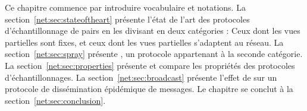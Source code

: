 Ce chapitre commence par introduire vocabulaire et notations. La
section~\ref{net:sec:stateoftheart} présente l'état de l'art des protocoles
d'échantillonnage de pairs en les divisant en deux catégories : Ceux dont les
vues partielles sont fixes, et ceux dont les vues partielles s'adaptent au
réseau. La section~\ref{net:sec:spray} présente \SPRAY, un protocole appartenant
à la seconde catégorie. La section~\ref{net:sec:properties} présente et compare
les propriétés des protocoles d'échantillonnages. La
section~\ref{net:sec:broadcast} présente l'effet de \SPRAY sur un protocole de
dissémination épidémique de messages. Le chapitre se conclut à la
section~\ref{net:sec:conclusion}.

